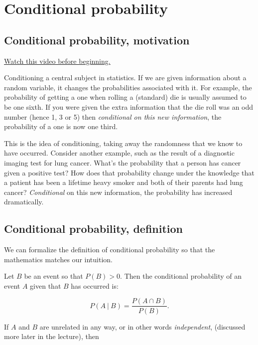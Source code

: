 \documentclass[]{article}
\begin{document}
\newpage

\section{Conditional probability}\label{conditional-probability}

\subsection{Conditional probability,
motivation}\label{conditional-probability-motivation}

\href{http://youtu.be/u6AH6qsSVA4?list=PLpl-gQkQivXiBmGyzLrUjzsblmQsLtkzJ}{Watch
this video before beginning.}

Conditioning a central subject in statistics. If we are given
information about a random variable, it changes the probabilities
associated with it. For example, the probability of getting a one when
rolling a (standard) die is usually assumed to be one sixth. If you were
given the extra information that the die roll was an odd number (hence
1, 3 or 5) then \emph{conditional on this new information}, the
probability of a one is now one third.

This is the idea of conditioning, taking away the randomness that we
know to have occurred. Consider another example, such as the result of a
diagnostic imaging test for lung cancer. What's the probability that a
person has cancer given a positive test? How does that probability
change under the knowledge that a patient has been a lifetime heavy
smoker and both of their parents had lung cancer? \emph{Conditional} on
this new information, the probability has increased dramatically.

\subsection{Conditional probability,
definition}\label{conditional-probability-definition}

We can formalize the definition of conditional probability so that the
mathematics matches our intuition.

Let $B$ be an event so that $P(B) > 0$. Then the conditional probability
of an event $A$ given that $B$ has occurred is:

\[
P(A ~|~ B) = \frac{P(A \cap B)}{P(B)}.
\]

If $A$ and $B$ are unrelated in any way, or in other words
\emph{independent}, (discussed more later in the lecture), then
\end{document}
